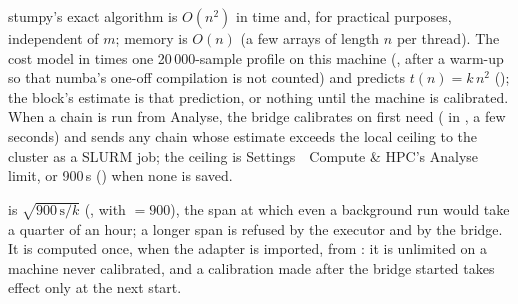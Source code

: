 stumpy's exact algorithm is $O(n^2)$ in time and, for practical purposes, independent of $m$;
memory is $O(n)$ (a few arrays of length $n$ per thread). The cost model in
 times one 20\,000-sample profile on this machine
(, after a warm-up so that numba's one-off compilation is not counted) and predicts
$t(n) = k\,n^2$ (); the block's estimate is that prediction, or nothing
until the machine is calibrated. When a chain is run from Analyse, the bridge calibrates on first
need ( in , a few seconds) and sends any chain whose
estimate exceeds the local ceiling to the cluster as a SLURM job; the ceiling is
Settings~\textrightarrow~Compute \& HPC's Analyse limit, or 900\,s
() when none is saved.

 is $\sqrt{900\,\mathrm{s}/k}$ (,
with  $= 900$), the span at which even a background run would take a
quarter of an hour; a longer span is refused by the executor and by the bridge. It is computed once,
when the adapter is imported, from : it is unlimited on a machine
never calibrated, and a calibration made after the bridge started takes effect only at the next
start. 

